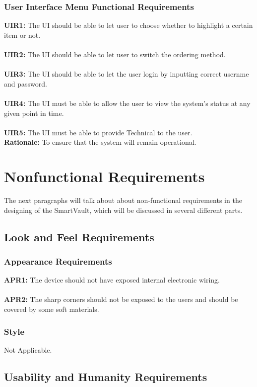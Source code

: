 \documentclass[12pt]{article}
\begin{document}
\subsubsection{User Interface Menu Functional Requirements}
\textbf{UIR1:} The UI should be able to let user to choose whether to highlight a certain item or not.\\\\
\textbf{UIR2:} The UI should be able to let user to switch the ordering method.\\\\
\textbf{UIR3:} The UI should be able to let the user login by inputting correct usernme and password.\\\\
\textbf{UIR4:} The UI must be able to allow the user to view the system's status at any given point in time.\\\\
\textbf{UIR5:} The UI must be able to provide Technical to the user. \\
\textbf{Rationale:} To ensure that the system will remain operational.






\section{Nonfunctional Requirements}
The next paragraphs will talk about about non-functional requirements in the designing of the SmartVault, which will be discussed in several different parts. 
\subsection{Look and Feel Requirements}
\subsubsection{Appearance Requirements}
\textbf{APR1:} The device should not have exposed internal electronic wiring.\\\\
\textbf{APR2:} The sharp corners should not be exposed to the users and should be covered by some soft materials.
\subsubsection{Style}
Not Applicable.
\subsection{Usability and Humanity Requirements}
\end{document}
